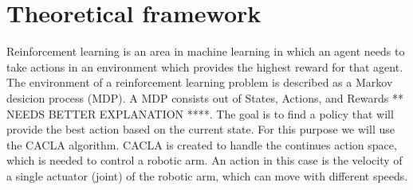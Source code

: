 \section{Theoretical framework}
Reinforcement learning is an area in machine learning in which an agent needs to take actions in an environment which provides the highest reward for that agent. The environment of a reinforcement learning problem
is described as a Markov desicion process (MDP). A MDP consists out of States, Actions, and Rewards ** NEEDS BETTER EXPLANATION ****. The goal is to find a policy that will provide the best action based on the current state. 
For this purpose we will use the CACLA algorithm. CACLA is created to handle the continues action space, which is needed to control a robotic arm. An action in this case is the velocity of a single actuator (joint) of the 
robotic arm, which can move with different speeds. 

 
